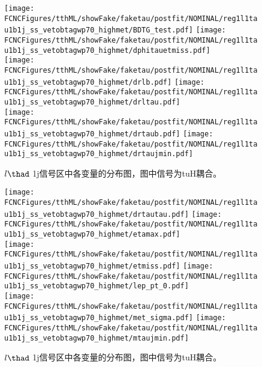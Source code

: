 \begin{figure}[H]
\centering
\texttt{[image: \\FCNCFigures/tthML/showFake/faketau/postfit/NOMINAL/reg1l1tau1b1j\_ss\_vetobtagwp70\_highmet/BDTG\_test.pdf]}
\texttt{[image: \\FCNCFigures/tthML/showFake/faketau/postfit/NOMINAL/reg1l1tau1b1j\_ss\_vetobtagwp70\_highmet/dphitauetmiss.pdf]}
\\
\texttt{[image: \\FCNCFigures/tthML/showFake/faketau/postfit/NOMINAL/reg1l1tau1b1j\_ss\_vetobtagwp70\_highmet/drlb.pdf]}
\texttt{[image: \\FCNCFigures/tthML/showFake/faketau/postfit/NOMINAL/reg1l1tau1b1j\_ss\_vetobtagwp70\_highmet/drltau.pdf]}
\\
\texttt{[image: \\FCNCFigures/tthML/showFake/faketau/postfit/NOMINAL/reg1l1tau1b1j\_ss\_vetobtagwp70\_highmet/drtaub.pdf]}
\texttt{[image: \\FCNCFigures/tthML/showFake/faketau/postfit/NOMINAL/reg1l1tau1b1j\_ss\_vetobtagwp70\_highmet/drtaujmin.pdf]}
\\
\caption{$l\thad$ 1j信号区中各变量的分布图，图中信号为tuH耦合。}
\label{fig:var_reg1l1tau1b1j_ss_vetobtagwp70_highmet_1}
\end{figure}
\begin{figure}[H]
\centering
\texttt{[image: \\FCNCFigures/tthML/showFake/faketau/postfit/NOMINAL/reg1l1tau1b1j\_ss\_vetobtagwp70\_highmet/drtautau.pdf]}
\texttt{[image: \\FCNCFigures/tthML/showFake/faketau/postfit/NOMINAL/reg1l1tau1b1j\_ss\_vetobtagwp70\_highmet/etamax.pdf]}
\\
\texttt{[image: \\FCNCFigures/tthML/showFake/faketau/postfit/NOMINAL/reg1l1tau1b1j\_ss\_vetobtagwp70\_highmet/etmiss.pdf]}
\texttt{[image: \\FCNCFigures/tthML/showFake/faketau/postfit/NOMINAL/reg1l1tau1b1j\_ss\_vetobtagwp70\_highmet/lep\_pt\_0.pdf]}
\\
\texttt{[image: \\FCNCFigures/tthML/showFake/faketau/postfit/NOMINAL/reg1l1tau1b1j\_ss\_vetobtagwp70\_highmet/met\_sigma.pdf]}
\texttt{[image: \\FCNCFigures/tthML/showFake/faketau/postfit/NOMINAL/reg1l1tau1b1j\_ss\_vetobtagwp70\_highmet/mtaujmin.pdf]}
\\
\caption{$l\thad$ 1j信号区中各变量的分布图，图中信号为tuH耦合。}
\label{fig:var_reg1l1tau1b1j_ss_vetobtagwp70_highmet_2}
\end{figure}
